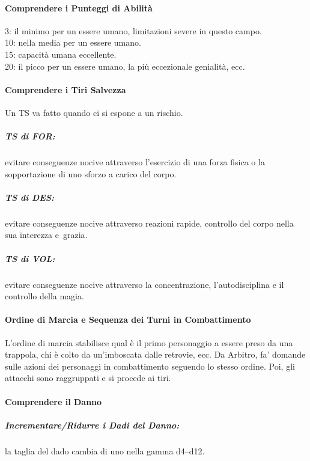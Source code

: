 \documentclass[itdr]{subfiles}
\begin{document}
\vfill

\paragraph{Comprendere i Punteggi di Abilità}
3: il minimo per un essere umano, limitazioni severe in questo campo.\\
10: nella media per un essere umano.\\
15: capacità umana eccellente.\\
20: il picco per un essere umano, la più eccezionale genialità, ecc.

\vfill

\paragraph{Comprendere i Tiri Salvezza}
Un TS va fatto quando ci si espone a un rischio.

\subparagraph{TS di FOR:} evitare conseguenze nocive attraverso \mbox{l’esercizio} di una forza fisica o la sopportazione di uno sforzo a carico del corpo.

\subparagraph{TS di DES:} evitare conseguenze nocive attraverso reazioni rapide, controllo del corpo nella sua interezza e~grazia.

\subparagraph{TS di VOL:} evitare conseguenze nocive attraverso la concentrazione, l'autodisciplina e il controllo della magia.

\vfill
\break

\paragraph{Ordine di Marcia e Sequenza dei Turni in Combattimento}
L’ordine di marcia stabilisce qual è il primo personaggio a essere preso da una trappola, chi è colto da un’imboscata dalle retrovie, ecc. Da Arbitro, fa’ domande sulle azioni dei personaggi in combattimento seguendo lo stesso ordine. Poi, gli attacchi sono raggruppati e si procede ai tiri.

\vfill

\paragraph{Comprendere il Danno}
\subparagraph{Incrementare/Ridurre i Dadi del Danno:} la taglia del dado cambia di uno nella gamma d4--d12.
\end{document}

